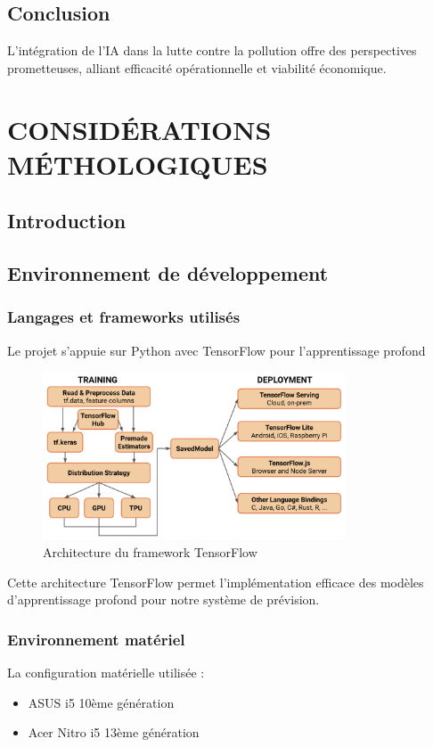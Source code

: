\documentclass[12pt,a4paper]{report}
\begin{document}
\section{Conclusion}
L'intégration de l'IA dans la lutte contre la pollution offre des perspectives prometteuses, alliant efficacité opérationnelle et viabilité économique.
\chapter{CONSIDÉRATIONS MÉTHOLOGIQUES}
\section{Introduction}
\lipsum[1-2]
\section{Environnement de développement}

\subsection{Langages et frameworks utilisés}
Le projet s'appuie sur Python avec TensorFlow pour l'apprentissage profond \cite{Goodfellow2016}

\begin{figure}[h]
    \centering
    \includegraphics[width=0.8\textwidth]{tensor flow.png}  
    \caption{Architecture du framework TensorFlow}
    \label{fig:tensorflow}
\end{figure}

Cette architecture TensorFlow permet l'implémentation efficace des modèles d'apprentissage profond pour notre système de prévision.

\subsection{Environnement matériel}
La configuration matérielle utilisée :
\begin{itemize}
    \item ASUS i5 10ème génération
    \item Acer Nitro i5 13ème génération
\end{itemize}
\end{document}
